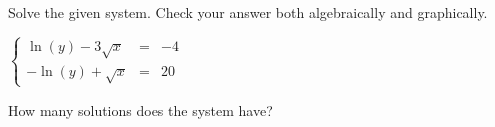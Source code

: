 \documentclass{ximera}
\author{Kenneth Berglund}
\begin{document}
\licenseSZ

Solve the given system. Check your answer both algebraically and graphically.

$\left\{ \begin{array}{rcr} \ln(y) -3\sqrt{x} & = & -4 \\ -\ln(y) + \sqrt{x}  & = & 20  \end{array} \right.$

\begin{exercise}
How many solutions does the system have?
\begin{multipleChoice}  
\end{multipleChoice}  
\end{exercise}
\end{document}
